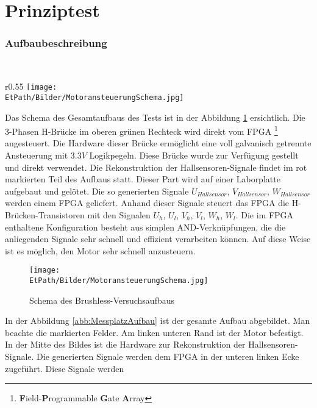 \ifSTANDALONE
\section{Prinziptest}
\fi
\ifEMBED
\subsubsection{Aufbaubeschreibung}
    \BLDCcollab \\
\fi
\ifEMBED
    \begin{wrapfigure}{r}{0.55\textwidth}
       	\texttt{[image: \\EtPath/Bilder/MotoransteuerungSchema.jpg]}
       	\centering
       	\caption{Schema des Brushless-Versuchsaufbaus}
        \label{abb:MotoransteuerungSchema}
    \end{wrapfigure}
\fi
    Das Schema des Gesamtaufbaus des Tests ist in der Abbildung 
    \ref{abb:MotoransteuerungSchema} ersichtlich. Die 3-Phasen H-Brücke im 
    oberen grünen Rechteck wird direkt vom FPGA
    \footnote{\textbf{F}ield-\textbf{P}rogrammable \textbf{G}ate 
    \textbf{A}rray} angesteuert. Die Hardware dieser Brücke ermöglicht eine 
    voll galvanisch getrennte Ansteuerung mit $3.3 V$ Logikpegeln. Diese 
    Brücke wurde zur Verfügung gestellt und direkt verwendet. Die 
    Rekonstruktion der Hallsensoren-Signale findet im rot markierten Teil des 
    Aufbaus statt. Dieser Part wird auf einer Laborplatte aufgebaut und 
    gelötet. Die so generierten Signale $U_{Hallsensor}$, $V_{Hallsensor}$, 
    $W_{Hallsensor}$ werden einem FPGA geliefert. Anhand dieser Signale 
    steuert das FPGA die H-Brücken-Transistoren mit den Signalen $U_h$, $U_l$, 
    $V_h$, $V_l$, $W_h$, $W_l$. Die im FPGA enthaltene Konfiguration besteht 
    aus simplen AND-Verknüpfungen, die die anliegenden Signale sehr schnell 
    und effizient verarbeiten können. Auf diese Weise ist es möglich, den 
    Motor sehr schnell anzusteuern.
    \ifSTANDALONE
    \begin{figure}[h!]
    	\texttt{[image: \\EtPath/Bilder/MotoransteuerungSchema.jpg]}
       	\centering
       	\caption{Schema des Brushless-Versuchsaufbaus}
        \label{abb:MotoransteuerungSchema}
    \end{figure}
    \fi
    In der Abbildung \ref{abb:MessplatzAufbau} ist der gesamte Aufbau 
    abgebildet. Man beachte die markierten Felder. Am linken unteren Rand ist 
    der Motor befestigt. In der Mitte des Bildes ist die Hardware zur 
    Rekonstruktion der Hallsensoren-Signale.  Die generierten Signale werden 
    dem FPGA in der unteren linken Ecke zugeführt. Diese Signale werden 
